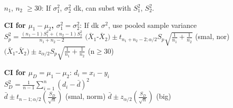 \documentclass[a4paper,landscape]{article}
\newcommand{\rnname}[1]{\textbf{#1}}
\begin{document}
\begin{multicols*}{4}
\begin{flatitemize}
$n_1$, $n_2$ $\geq 30$: If $\sigma_1^2$, $\sigma_2^2$ dk, can subst with $S_1^2$, $S_2^2$.
\item \rnname{CI for $\mu_1 - \mu_2$, $\sigma_1^2 = \sigma_2^2$}:
If dk $\sigma^2$, use pooled sample variance $S_p^2 = \frac{(n_1 - 1)S_1^2 + (n_2 - 1)S_2^2}{n_1 + n_2 - 2}$
$(\bar X_1$-$\bar X_2) \pm t_{n_1+n_2-2;\alpha/2}S_p\sqrt{\frac{1}{n_1}+\frac{1}{n_2}}$ (smal, nor)\\
$(\bar X_1$-$\bar X_2) \pm z_{\alpha/2}S_p\sqrt{\frac{1}{n_1}+\frac{1}{n_2}}$ (n$\geq$30)



\item \rnname{CI for $\mu_D=\mu_1-\mu_2$}:
$d_i = x_i - y_i$ \\ $S_D^2 = \frac{1}{n-1}\sum_{i=1}^n(d_i-\bar d)^2$ \\
$\bar d \pm t_{n-1;\alpha/2}(\frac{S_D}{\sqrt{n}})$ (smal, norm)
$\bar d \pm z_{\alpha/2}(\frac{S_D}{\sqrt{n}})$ (big)



\end{flatitemize}
\end{multicols*}
\end{document}
